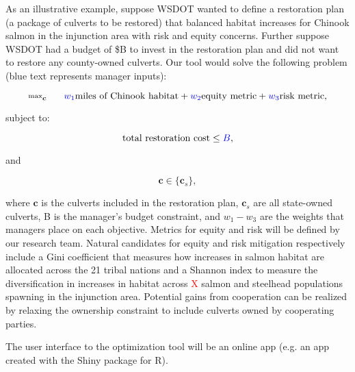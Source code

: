\documentclass[12pt]{elsarticle}
\begin{document}
As an illustrative example, suppose WSDOT wanted to define a restoration plan (a package of culverts to be restored) that balanced habitat increases for Chinook salmon in the injunction area with risk and equity concerns. Further suppose WSDOT had a budget of \$B to invest in the restoration plan and did not want to restore any county-owned culverts. Our tool would solve the following problem (blue text represents manager inputs):

\begin{equation*}
\substack{\text{max}}_{\boldsymbol{c}}\hspace{0.25in} \textcolor{blue}{w_1} \text{miles of Chinook habitat} + \textcolor{blue}{w_2} \text{equity metric} + \textcolor{blue}{w_3} \text{risk metric},
\end{equation*}

\noindent subject to:

\begin{equation*}
\text{total restoration cost} \le \textcolor{blue}{B},
\end{equation*}

\noindent and

\begin{equation*}
\boldsymbol{c} \in \{\boldsymbol{c}_s  \},
\end{equation*}

where $\boldsymbol{c}$ is the culverts included in the restoration plan, $\boldsymbol{c}_s$ are all state-owned culverts, B is the manager's budget constraint, and $w_1-w_3$ are the weights that managers place on each objective. Metrics for equity and risk will be defined by our research team. Natural candidates for equity and risk mitigation respectively include a Gini coefficient that measures how increases in salmon habitat are allocated across the 21 tribal nations and a Shannon index to measure the diversification in increases in habitat across \textcolor{red}{X} salmon and steelhead populations spawning in the injunction area. Potential gains from cooperation can be realized by relaxing the ownership constraint to include culverts owned by cooperating parties.

The user interface to the optimization tool will be an online app (e.g. an app created with the Shiny package for R).
\end{document}
